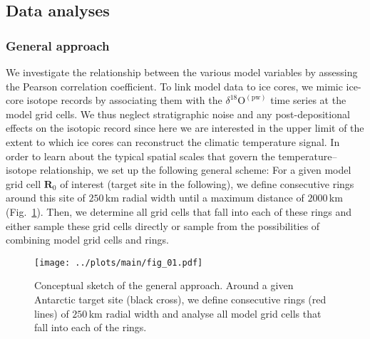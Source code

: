 \documentclass[cp, manuscript]{copernicus}
\begin{document}
\subsection{Data analyses}\label{methods:main}

\subsubsection{General approach}\label{methods:general}

We investigate the relationship between the various model variables by assessing
the Pearson correlation coefficient. To link model data to ice cores, we mimic
ice-core isotope records by associating them with the
$\delta^{18}\mathrm{O}^{\mathrm{(pw)}}$ time series at the model grid cells. We
thus neglect stratigraphic noise and any post-depositional effects on the
isotopic record since here we are interested in the upper limit of the extent to
which ice cores can reconstruct the climatic temperature signal. In order to
learn about the typical spatial scales that govern the temperature--isotope
relationship, we set up the following general scheme: For a given model grid
cell $\mathbf{R}_0$ of interest (target site in the following), we define
consecutive rings around this site of $250$\,km radial width until a maximum
distance of $2000$\,km (Fig.~\ref{fig:concept}). Then, we determine all grid
cells that fall into each of these rings and either sample these grid cells
directly or sample from the possibilities of combining model grid cells and
rings.

\begin{figure}[t]%
\centering
\texttt{[image: ../plots/main/fig\_01.pdf]}
\caption[Conceptual approach]{%
  Conceptual sketch of the general approach. Around a given Antarctic target
  site (black cross), we define consecutive rings (red lines) of $250$\,km
  radial width and analyse all model grid cells that fall into each of the
  rings.}
\label{fig:concept}%
\end{figure}%

\end{document}
